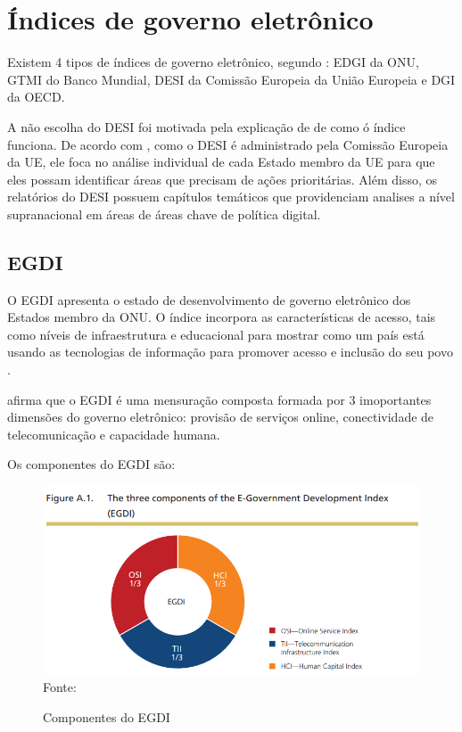 \section{Índices de governo eletrônico}

Existem 4 tipos de índices de governo eletrônico, segundo \cite{martinez2022egovernment}: EDGI da ONU, GTMI do Banco Mundial, DESI da Comissão Europeia da União Europeia e DGI da OECD.

A não escolha do DESI foi motivada pela explicação de \cite{desi_2022} de como ó índice funciona. De acordo com \cite{desi_2022}, como o DESI é administrado pela Comissão Europeia da UE, ele foca no análise individual de cada Estado membro da UE para que eles possam identificar áreas que precisam de ações prioritárias. Além disso, os relatórios do DESI possuem capítulos temáticos que providenciam analises a nível supranacional em áreas de áreas chave de política digital.

\subsection{EGDI}

O EGDI apresenta o estado de desenvolvimento de governo eletrônico dos Estados membro da ONU. O índice incorpora as características de acesso, tais como níveis de infraestrutura e educacional para mostrar como um país está usando as tecnologias de informação para promover acesso e inclusão do seu povo \cite{ONU_egdi}.

\cite{ONU_egdi} afirma que o EGDI é uma mensuração composta formada por 3 imoportantes dimensões do governo eletrônico: provisão de serviços online, conectividade de telecomunicação e capacidade humana.

Os componentes do EGDI são:

\begin{figure}[H]
	\centering
	\caption{Componentes do EGDI}
	\includegraphics[width=1\linewidth]{figuras/egdi/egdi_componentes.png}
	\label{fig:egdi_componentes}
	\footnotesize{Fonte: \cite{ONU_egdi_methodology}}
\end{figure}

